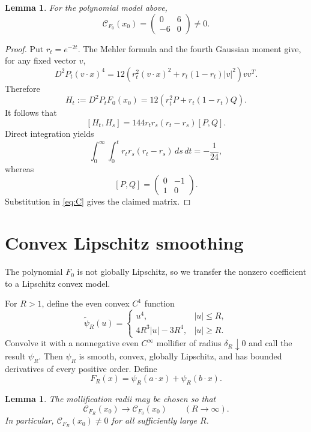 \documentclass[11pt]{article}
\newtheorem{lemma}[theorem]{Lemma}
\newcommand{\Hess}{D^2}
\newcommand{\comm}[2]{[#1,#2]}
\begin{document}
\begin{lemma}\label{lem:quartic}
For the polynomial model above,
\[
 \mathcal C_{F_0}(x_0)
 =\begin{pmatrix}0&6\\-6&0\end{pmatrix}\neq0.
\]
\end{lemma}

\begin{proof}
Put $r_t=e^{-2t}$.  The Mehler formula and the fourth Gaussian moment give,
for any fixed vector $v$,
\[
 D^2P_t(v\cdot x)^4
 =12\left(r_t^2(v\cdot x)^2+r_t(1-r_t)\lvert v\rvert^2\right)vv^T.
\]
Therefore
\[
 H_t:=\Hess P_tF_0(x_0)
 =12\left(r_t^2P+r_t(1-r_t)Q\right).
\]
It follows that
\[
 \comm{H_t}{H_s}
 =144r_tr_s(r_t-r_s)\comm{P}{Q}.
\]
Direct integration yields
\[
 \int_0^\infty\int_0^t
 r_tr_s(r_t-r_s)\,ds\,dt=-\frac1{24},
\]
whereas
\[
 \comm{P}{Q}=\begin{pmatrix}0&-1\\1&0\end{pmatrix}.
\]
Substitution in \eqref{eq:C} gives the claimed matrix.
\end{proof}

\section{Convex Lipschitz smoothing}

The polynomial $F_0$ is not globally Lipschitz, so we transfer the nonzero
coefficient to a Lipschitz convex model.

For $R>1$, define the even convex $C^1$ function
\[
 \widetilde\psi_R(u)=
 \begin{cases}
 u^4,& |u|\leq R,\\
 4R^3|u|-3R^4,& |u|\geq R.
 \end{cases}
\]
Convolve it with a nonnegative even $C^\infty$ mollifier of radius
$\delta_R\downarrow0$ and call the result $\psi_R$.  Then $\psi_R$ is smooth,
convex, globally Lipschitz, and has bounded derivatives of every positive
order. Define
\[
 F_R(x)=\psi_R(a\cdot x)+\psi_R(b\cdot x).
\]

\begin{lemma}\label{lem:smooth}
The mollification radii may be chosen so that
\[
 \mathcal C_{F_R}(x_0)\longrightarrow\mathcal C_{F_0}(x_0)
 \qquad(R\to\infty).
\]
In particular, $\mathcal C_{F_R}(x_0)\neq0$ for all sufficiently large $R$.
\end{lemma}
\end{document}
